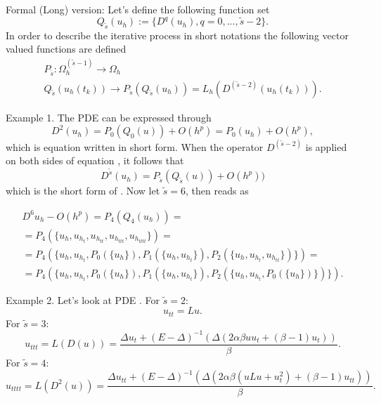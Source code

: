 \documentclass[11pt,a4paper,twoside]{article}
\begin{document}
\iffalse
Formal (Long) version:
Let's define the following function set
\begin{equation}
Q_{\tilde s}(u_h) := \{ D^{q}(u_h), q = 0, ... , \tilde s - 2 \}.
\end{equation}
In order to describe the iterative process in short notations the following vector valued functions are defined
\begin{align*} 
P_{\tilde s} : \Omega_h^{(\tilde s - 1)} \rightarrow \Omega_h
\\ Q_{\tilde s}(u_h(t_k)) \rightarrow P_{\tilde s} (Q_{\tilde s}(u_h) ) = L_h( D^{(\tilde s - 2)} (u_h(t_k)) ).
\end{align*}

Example 1. The PDE  can be expressed through 
\begin{equation}\label{example}
D^{2}(u_h) = P_0(Q_0(u)) + O(h^p) = P_0(u_h) + O(h^p),
\end{equation}
which is equation  written in short form. When the operator $D^{(\tilde s -2)}$ is applied on both sides of equation , it follows that
\begin{equation}\label{DPeq}
D^{\tilde s}(u_h) = P_{\tilde s}(Q_{\tilde s}(u)) + O(h^p))
\end{equation}
which is the short form of . Now let $\tilde s = 6$, then  reads as

\begin{align*} 
D^6 u_h - O(h^p) = P_4(Q_4(u_h)) =
\\
= P_4(\{u_{ h}, u_{ h_{t} }, u_{ h_{tt} }, u_{ h_{ttt} }, u_{ h_{tttt} } \}) = 
\\
= P_4(\{u_{ h}, u_{ h_{t} }, P_0(\{u_h\}),  P_1( \{ u_h, u_{ h_{t} } \} ), P_2( \{ u_h, u_{ h_{t} }, u_{ h_{tt} } \} )  \}) = 
\\ 
= P_4(\{u_{ h}, u_{ h_{t} }, P_0(\{u_h\}),  P_1( \{ u_h, u_{ h_{t} } \} ), P_2( \{ u_h, u_{ h_{t} },  P_0( \{ u_h \} ) \} )  \}).
\end{align*}

Example 2. Let's look at PDE . For $\tilde s = 2$:
$$
u_{tt} = Lu.
$$
For $\tilde s = 3$:
$$
u_{ttt} = L(D(u)) = \frac{ \Delta u_t + (E - \Delta)^{-1}           ( \Delta (2 \alpha \beta u u_t  +                          (\beta -1)u_t) )  }{\beta}.
$$
For $\tilde s = 4$:
$$
u_{tttt} = L(D^2(u)) = \frac{ \Delta u_{tt} + (E - \Delta)^{-1}( \Delta (2 \alpha \beta ( u Lu +  u_t^2 )   + (\beta -1) u_{tt} ) )  }{\beta}.
$$
\end{document}
